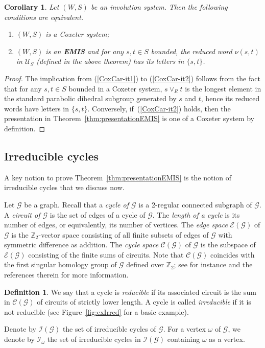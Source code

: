 \documentclass[A4paper, oneside]{amsart}
\newcommand{\Z}{\mathbb{Z}}
\newcommand{\Irr}{\mathcal{I}}
\newcommand{\U}{\mathcal{U}}
\newcommand{\G}{\mathcal{G}}
\newcommand{\EMIS}{\textnormal{\bf EMIS}\xspace}
\newtheorem{cor}[thm]{Corollary}
\theoremstyle{definition}
\newtheorem{defi}[thm]{Definition}
\begin{document}
\begin{cor}\label{cor:CoxeterCharac} Let $(W,S)$ be an involution system. Then the following conditions are equivalent.
\begin{enumerate}
\item\label{CoxCar-it1} $(W,S)$ is a Coxeter system;
\item\label{CoxCar-it2} $(W,S)$ is an \EMIS and for any $s,t\in S$ bounded, the reduced word $\nu(s,t)$ in $\U_S$ (defined in the above theorem) has its letters in $\{s,t\}$.
\end{enumerate}
\end{cor}
\begin{proof} The implication from (\ref{CoxCar-it1}) to (\ref{CoxCar-it2}) follows from the fact that for any $s,t\in S$ bounded in a Coxeter system,  $s\vee_R t$ is the longest element in the standard parabolic dihedral subgroup generated by $s$ and $t$, hence its reduced words have letters in $\{s,t\}$. Conversely, if~(\ref{CoxCar-it2}) holds, then the presentation in Theorem~\ref{thm:presentationEMIS} is one of a Coxeter system by definition. 
\end{proof}




\subsection{Irreducible cycles}\label{ss:CycleSpace}  A key notion to prove Theorem~\ref{thm:presentationEMIS} is the notion of irreducible cycles that we discuss now. 

Let $\G$ be a graph. Recall that a {\em cycle of $\G$} is a 2-regular connected subgraph of $\G$. A {\em circuit of $\G$} is the set of edges of a cycle of $\G$. The {\em length of a cycle} is its number of edges, or equivalently, its number of vertices. The \emph{edge space} $\mathcal{E}(\G)$ of $\G$ is the $\Z_2$-vector space consisting of all finite subsets of edges of $\G$ with symmetric difference as addition. The \emph{cycle space} $\mathcal{C}(\G)$ of $\G$ is the subspace of $\mathcal{E}(\G)$ consisting of the finite sums of circuits. Note that $\mathcal{C}(\G)$ coincides with the first singular homology group of $\G$ defined over $\Z_2$; see for instance \cite{cubicplanar} and the references therein for more information.


\begin{defi}
    We say that a cycle is {\em reducible} if its associated circuit is the sum in $\mathcal{C}(\G)$ of circuits of strictly lower length.  A cycle is called \emph{irreducible} if it is not reducible (see Figure~\ref{fig:exIrred} for a basic example). 
    
    Denote by $\Irr(\G)$ the set of irreducible cycles of $\G$. For a vertex $\omega$ of $\G$, we denote by $\Irr_\omega$ the set of irreducible cycles in $\Irr(\G)$ containing $\omega$ as a vertex. 
\end{defi}
\end{document}
